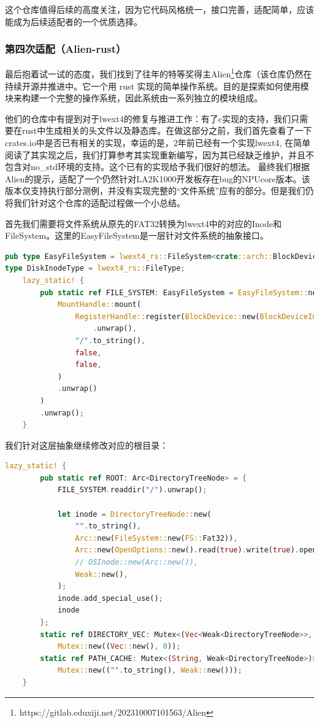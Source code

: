 这个仓库值得后续的高度关注，因为它代码风格统一，接口完善，适配简单，应该能成为后续适配者的一个优质选择。

\subsubsection{第四次适配（Alien-rust）}

最后抱着试一试的态度，我们找到了往年的特等奖得主Alien\footnote{https://gitlab.eduxiji.net/202310007101563/Alien}仓库（该仓库仍然在持续开源并推进中。它一个用 rust 实现的简单操作系统。目的是探索如何使用模块来构建一个完整的操作系统，因此系统由一系列独立的模块组成。

他们的仓库中有提到对于lwext4的修复与推进工作：有了c实现的支持，我们只需要在rust中生成相关的头文件以及静态库。在做这部分之前，我们首先查看了一下crates.io中是否已有相关的实现，幸运的是，2年前已经有一个实现lwext4, 在简单阅读了其实现之后，我们打算参考其实现重新编写，因为其已经缺乏维护，并且不包含对no_std环境的支持。这个已有的实现给予我们很好的想法。
最终我们根据Alien的提示，适配了一个仍然针对LA2K1000开发板存在bug的NPUcore版本。该版本仅支持执行部分测例，并没有实现完整的“文件系统”应有的部分。但是我们仍将我们针对这个仓库的适配过程做一个小总结。

首先我们需要将文件系统从原先的FAT32转换为lwext4中的对应的Inode和FileSystem。这里的EasyFileSystem是一层针对文件系统的抽象接口。
\begin{lstlisting}[language={Rust}, caption={FILE_SYSTEM修改}]
pub type EasyFileSystem = lwext4_rs::FileSystem<crate::arch::BlockDeviceImpl>;
type DiskInodeType = lwext4_rs::FileType;
    lazy_static! {
        pub static ref FILE_SYSTEM: EasyFileSystem = EasyFileSystem::new(
            MountHandle::mount(
                RegisterHandle::register(BlockDevice::new(BlockDeviceImpl::new()), "shit".to_string())
                    .unwrap(),
                "/".to_string(),
                false,
                false,
            )
            .unwrap()
        )
        .unwrap();
    }
\end{lstlisting}

我们针对这层抽象继续修改对应的根目录：
\begin{lstlisting}[language={Rust}, caption={ROOT修改}]
    lazy_static! {
        pub static ref ROOT: Arc<DirectoryTreeNode> = {
            FILE_SYSTEM.readdir("/").unwrap();
    
            let inode = DirectoryTreeNode::new(
                "".to_string(),
                Arc::new(FileSystem::new(FS::Fat32)),
                Arc::new(OpenOptions::new().read(true).write(true).open("/").unwrap()),
                // OSInode::new(Arc::new()),
                Weak::new(),
            );
            inode.add_special_use();
            inode
        };
        static ref DIRECTORY_VEC: Mutex<(Vec<Weak<DirectoryTreeNode>>, usize)> =
            Mutex::new((Vec::new(), 0));
        static ref PATH_CACHE: Mutex<(String, Weak<DirectoryTreeNode>)> =
            Mutex::new(("".to_string(), Weak::new()));
    }
    \end{lstlisting}

